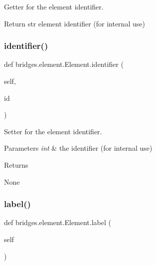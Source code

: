 Getter for the element identifier. 

\begin{DoxyParagraph}{Return}
str element identifier (for internal use) 
\end{DoxyParagraph}
\mbox{\label{classbridges_1_1element_1_1_element_a70ac403466ed78146974a22cebfa0c19}} 
\subsubsection{\texorpdfstring{identifier()}{identifier()}\hspace{0.1cm}{\footnotesize\ttfamily [2/2]}}
{\footnotesize\ttfamily def bridges.\+element.\+Element.\+identifier (\begin{DoxyParamCaption}\item[{}]{self,  }\item[{}]{id }\end{DoxyParamCaption})}



Setter for the element identifier. 


\begin{DoxyParams}{Parameters}
{\em int} & the identifier (for internal use) \\
\hline
\end{DoxyParams}
\begin{DoxyReturn}{Returns}


None 
\end{DoxyReturn}
\mbox{\label{classbridges_1_1element_1_1_element_a3cd2f535bb7993254b8d255cb0166062}} 
\subsubsection{\texorpdfstring{label()}{label()}\hspace{0.1cm}{\footnotesize\ttfamily [1/2]}}
{\footnotesize\ttfamily def bridges.\+element.\+Element.\+label (\begin{DoxyParamCaption}\item[{}]{self }\end{DoxyParamCaption})}



